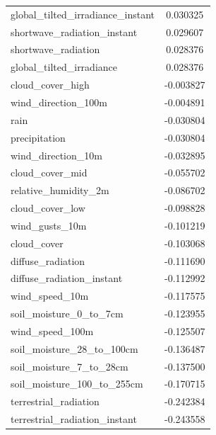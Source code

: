 \begin{table}[H]
\begin{tabular}{lc}
		global\_tilted\_irradiance\_instant    & 0.030325    \\ 
		shortwave\_radiation\_instant         & 0.029607    \\ 
		shortwave\_radiation                 & 0.028376    \\ 
		global\_tilted\_irradiance            & 0.028376    \\ 
		cloud\_cover\_high                   & -0.003827   \\ 
		wind\_direction\_100m                & -0.004891   \\ 
		rain                               & -0.030804   \\ 
		precipitation                      & -0.030804   \\ 
		wind\_direction\_10m                 & -0.032895   \\ 
		cloud\_cover\_mid                    & -0.055702   \\ 
		relative\_humidity\_2m               & -0.086702   \\ 
		cloud\_cover\_low                    & -0.098828   \\ 
		wind\_gusts\_10m                     & -0.101219   \\ 
		cloud\_cover                        & -0.103068   \\ 
		diffuse\_radiation                  & -0.111690   \\ 
		diffuse\_radiation\_instant          & -0.112992   \\ 
		wind\_speed\_10m                     & -0.117575   \\ 
		soil\_moisture\_0\_to\_7cm             & -0.123955   \\ 
		wind\_speed\_100m                    & -0.125507   \\ 
		soil\_moisture\_28\_to\_100cm          & -0.136487   \\ 
		soil\_moisture\_7\_to\_28cm            & -0.137500   \\ 
		soil\_moisture\_100\_to\_255cm         & -0.170715   \\ 
		terrestrial\_radiation              & -0.242384   \\ 
		terrestrial\_radiation\_instant      & -0.243558   \\ 
	\end{tabular}
\end{table}



